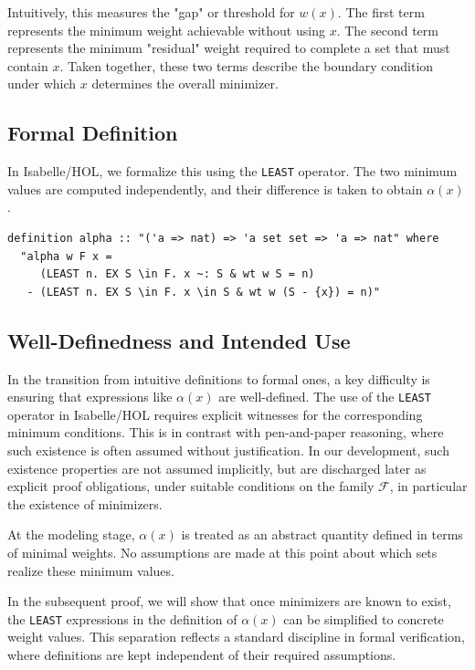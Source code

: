 Intuitively, this measures the "gap" or threshold for $w(x)$.
The first term represents the minimum weight achievable without using $x$.
The second term represents the minimum "residual" weight required to complete a set that must contain $x$.
Taken together, these two terms describe the boundary condition under which $x$ determines the overall minimizer.

\subsection*{Formal Definition}
In Isabelle/HOL, we formalize this using the \texttt{LEAST} operator.
The two minimum values are computed independently, and their difference is taken to obtain $\alpha(x)$.

\begin{lstlisting}[language=Isabelle, caption={Definition of Alpha}, label={lst:alpha_def}]
definition alpha :: "('a => nat) => 'a set set => 'a => nat" where
  "alpha w F x =
     (LEAST n. EX S \in F. x ~: S & wt w S = n)
   - (LEAST n. EX S \in F. x \in S & wt w (S - {x}) = n)"
\end{lstlisting}

\subsection*{Well-Definedness and Intended Use}
In the transition from intuitive definitions to formal ones, a key difficulty is ensuring that expressions like $\alpha(x)$ are well-defined.
The use of the \texttt{LEAST} operator in Isabelle/HOL requires explicit witnesses for the corresponding minimum conditions.
This is in contrast with pen-and-paper reasoning, where such existence is often assumed without justification.
In our development, such existence properties are not assumed implicitly, but are discharged later as explicit proof obligations, under suitable conditions on the family $\mathcal{F}$, in particular the existence of minimizers.

At the modeling stage, $\alpha(x)$ is treated as an abstract quantity defined in terms of minimal weights.
No assumptions are made at this point about which sets realize these minimum values.

In the subsequent proof, we will show that once minimizers are known to exist, the \texttt{LEAST} expressions in the definition of $\alpha(x)$ can be simplified to concrete weight values.
This separation reflects a standard discipline in formal verification, where definitions are kept independent of their required assumptions.

